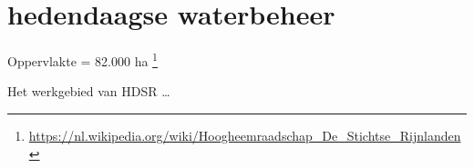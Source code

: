 \section{hedendaagse waterbeheer}

Oppervlakte = 82.000 ha \footnote{\url{https://nl.wikipedia.org/wiki/Hoogheemraadschap_De_Stichtse_Rijnlanden}}

Het werkgebied van HDSR \ldots

